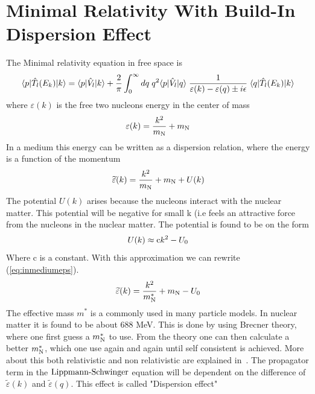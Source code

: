 \section{Minimal Relativity With Build-In Dispersion Effect}
The Minimal relativity equation in free space is
\begin{equation}\label{eq:Trelllllfree}
\braketm{{ p}} {\op{T}_l(E_{ k})}{{ k}}=\braketm{{ p}}{\op{V}_l}{{ k}}
+ \frac{2}{\pi}%
\int^{\infty}_{0}d { q}\; q^2\bra{{ p}}\op{V}_l\ket{{ q}}
\;\inv{{\varepsilon(k)}-{\varepsilon(q)\pm i\epsilon}}   \;\bra{{ q}} \op{T}_l(E_{ k})\ket{{ k}}
\end{equation}
where $\varepsilon(k)$ is the free two nucleons energy in the center of mass 
\begin{eqnarray}
\varepsilon(k)=\frac{k^2}{m_{{\text N}}}+m_{{\text N}}
\end{eqnarray}
In a medium this energy can be written as a dispersion relation, where the energy is a function of the momentum
\begin{eqnarray}\label{eq:inmediumeps}
\widetilde{\varepsilon}(k)=\frac{k^2}{m_{{\text N}}}+m_{{\text N}}+U(k)
\end{eqnarray}
The potential $U(k)$ arises because the nucleons interact with the nuclear matter. This potential will be negative
for small k (i.e feels an attractive force from the nucleons in the nuclear matter. The potential
is found to be on the form  
\begin{eqnarray}
U(k)\approx {{\text c}}k^2-U_0
\end{eqnarray}
Where c is a constant.
With this approximation we can rewrite  (\ref{eq:inmediumeps}).
\begin{eqnarray}\label{eq:inmediumeps2}
\widetilde{\varepsilon}(k)=\frac{k^2}{m^*_{{\text N}}}+m_{{\text N}}-U_0
\end{eqnarray}
The effective mass $m^*$ is a commonly used in many particle models. In nuclear matter it is found
to be about 688 MeV. This is done by using Brecner theory, where one first guess a $m^*_{{\text N}}$ to use. 
From the theory one can then calculate a better $m^*_{{\text N}}$, which one use again and again until self consistent is achieved.
More about this both relativistic and non relativistic are explained in~\cite{Macbok}.
The propagator term in the $\text{Lippmann-Schwinger}$ equation will be dependent on the difference of $\widetilde{\varepsilon}(k)$ 
and $\widetilde{\varepsilon}(q)$. This effect is called "Dispersion effect" 
